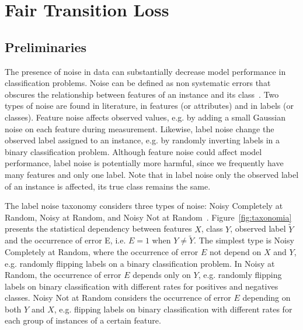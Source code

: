 \chapter{Fair Transition Loss}


\section{Preliminaries}

The presence of noise in data can substantially decrease model performance in classification problems. Noise can be defined as non systematic errors that obscures the relationship between features of an instance and its class~\citep{Frenay2014,Hickey1996,Quinlan1986}. Two types of noise are found in literature, in features (or attributes) and in labels (or classes). Feature noise affects observed values, e.g. by adding a small Gaussian noise on each feature during measurement. Likewise, label noise change the observed label assigned to an instance, e.g. by randomly inverting labels in a binary classification problem. Although feature noise could affect model performance, label noise is potentially more harmful, since we frequently have many features and only one label. Note that in label noise only the observed label of an instance is affected, its true class remains the same.

The label noise taxonomy considers three types of noise: Noisy Completely at Random, Noisy at Random, and Noisy Not at Random~\citep{Frenay2014}. Figure~\ref{fig:taxonomia} presents the statistical dependency between features $X$, class $Y$, observed label $\tilde{Y}$ and the occurrence of error E, i.e. $E=1$ when $Y \neq \tilde{Y}$. The simplest type is Noisy Completely at Random, where the occurrence of error $E$ not depend on $X$ and $Y$, e.g. randomly flipping labels on a binary classification problem. In Noisy at Random, the occurrence of error $E$ depends only on $Y$, e.g. randomly flipping labels on binary classification with different rates for positives and negatives classes. Noisy Not at Random considers the occurrence of error $E$ depending on both $Y$ and $X$, e.g. flipping labels on binary classification with different rates for each group of instances of a certain feature.


